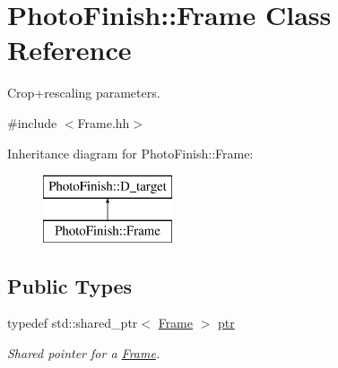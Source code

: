 \hypertarget{class_photo_finish_1_1_frame}{}\section{Photo\+Finish\+:\+:Frame Class Reference}
\label{class_photo_finish_1_1_frame}


Crop+rescaling parameters.  




{\ttfamily \#include $<$Frame.\+hh$>$}

Inheritance diagram for Photo\+Finish\+:\+:Frame\+:\begin{figure}[H]
\begin{center}
\leavevmode
\includegraphics[height=2.000000cm]{class_photo_finish_1_1_frame}
\end{center}
\end{figure}
\subsection*{Public Types}
\begin{DoxyCompactItemize}
\item 
typedef std\+::shared\+\_\+ptr$<$ \hyperlink{class_photo_finish_1_1_frame}{Frame} $>$ \hyperlink{class_photo_finish_1_1_frame_aaf5eaa56b8096024c0d45ad9e7f5e6c1}{ptr}
\begin{DoxyCompactList}\small\item\em Shared pointer for a \hyperlink{class_photo_finish_1_1_frame}{Frame}. \end{DoxyCompactList}\end{DoxyCompactItemize}
